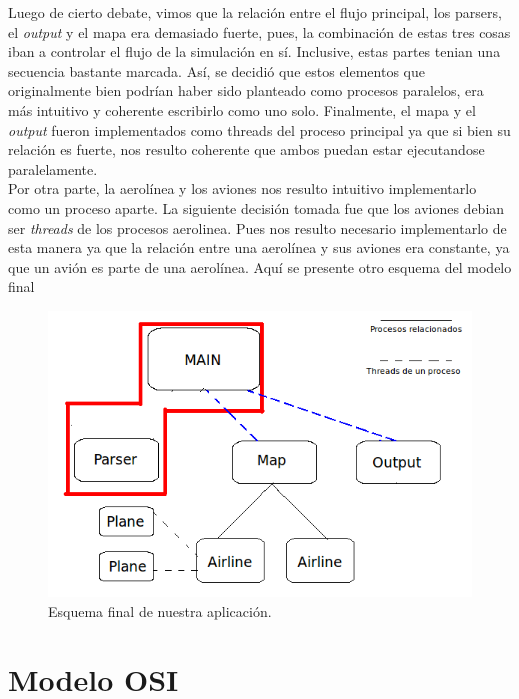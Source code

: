 \documentclass[a4paper,10pt]{article}
\begin{document}
 Luego de cierto debate, vimos que la relación entre el flujo principal, los parsers, el \textit{output} y el mapa era demasiado fuerte, pues, 
 la combinación de estas tres cosas iban a 
 controlar el flujo de la simulación en sí. Inclusive, estas partes tenian una secuencia bastante marcada. Así, se decidió que estos elementos que originalmente bien podrían haber 
 sido planteado como procesos paralelos, era más intuitivo y coherente escribirlo como uno solo.
 Finalmente, el mapa y el \textit{output} fueron implementados como threads del proceso principal ya que si bien su relación es fuerte, nos resulto coherente
  que ambos puedan estar ejecutandose paralelamente. \\

Por otra parte, la aerolínea y los aviones nos resulto intuitivo implementarlo como un proceso aparte. La siguiente decisión tomada fue que los aviones debian ser \textit{threads}
 de los procesos aerolinea. Pues nos resulto necesario implementarlo de esta manera ya que la relación entre una aerolínea y sus aviones era constante, ya que un avión es parte
  de una aerolínea. Aquí se presente otro esquema del modelo final\\

\begin{figure}[H]
\begin{center}
 \includegraphics[scale=0.6]{./images/Diagrama_simulacion_1.png}
 \caption{Esquema final de nuestra aplicación.}
\end{center}
\end{figure}

\newpage
\section{Modelo OSI}
\end{document}
